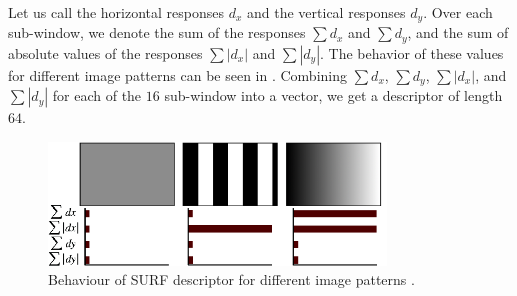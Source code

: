 Let us call the horizontal responses $d_x$ and the vertical responses $d_y$. Over each sub-window, we denote the sum of the responses $\sum d_x$ and $\sum d_y$, and the sum of absolute values of the responses $\sum |d_x|$ and $\sum |d_y|$. The behavior of these values for different image patterns can be seen in . Combining $\sum d_x$, $\sum d_y$, $\sum |d_x|$, and $\sum |d_y|$ for each of the $16$ sub-window into a vector, we get a descriptor of length $64$.

\begin{figure}
    \centering
    \includegraphics[width=0.8\textwidth]{Figures/surf/surf_descriptor.png}
    \caption[Behaviour of SURF descriptor for different image patterns]{Behaviour of SURF descriptor for different image patterns \cite{Bay2006}.}
    \label{fig:surf_descriptor}
\end{figure}
